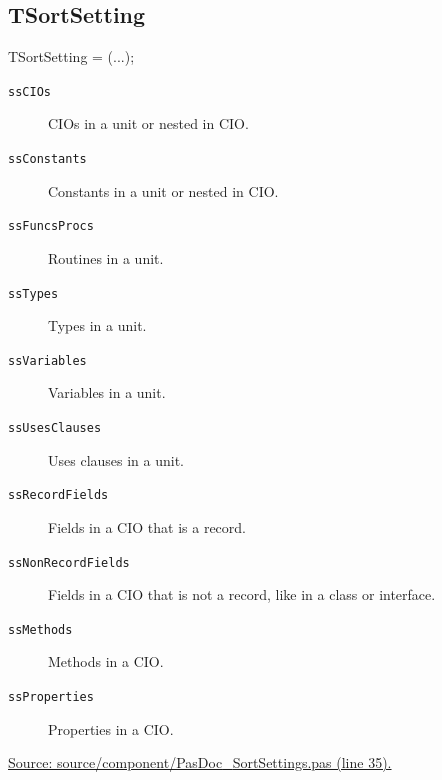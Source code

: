 \documentclass{report}
\newif\ifpdf
\begin{document}
\subsection*{TSortSetting}
\fi
\label{PasDoc_SortSettings-TSortSetting}
\begin{list}{}{
\setlength{\itemindent}{0cm}
\setlength{\listparindent}{0cm}
\setlength{\leftmargin}{\evensidemargin}
\addtolength{\leftmargin}{\tmplength}
\settowidth{\labelsep}{X}
\addtolength{\leftmargin}{\labelsep}
\setlength{\labelwidth}{\tmplength}
}
\item[\textbf{Declaration}\hfill]
\ifpdf
\begin{flushleft}
\fi
\begin{ttfamily}
TSortSetting = (...);\end{ttfamily}

\ifpdf
\end{flushleft}
\fi

\par
\item[\textbf{Description}]
 \item[\textbf{Values}]
\begin{description}
\item[\texttt{ssCIOs}] \label{PasDoc_SortSettings-ssCIOs}
\index{}
CIOs in a unit or nested in CIO.
\item[\texttt{ssConstants}] \label{PasDoc_SortSettings-ssConstants}
\index{}
Constants in a unit or nested in CIO.
\item[\texttt{ssFuncsProcs}] \label{PasDoc_SortSettings-ssFuncsProcs}
\index{}
Routines in a unit.
\item[\texttt{ssTypes}] \label{PasDoc_SortSettings-ssTypes}
\index{}
Types in a unit.
\item[\texttt{ssVariables}] \label{PasDoc_SortSettings-ssVariables}
\index{}
Variables in a unit.
\item[\texttt{ssUsesClauses}] \label{PasDoc_SortSettings-ssUsesClauses}
\index{}
Uses clauses in a unit.
\item[\texttt{ssRecordFields}] \label{PasDoc_SortSettings-ssRecordFields}
\index{}
Fields in a CIO that is a record.
\item[\texttt{ssNonRecordFields}] \label{PasDoc_SortSettings-ssNonRecordFields}
\index{}
Fields in a CIO that is not a record, like in a class or interface.
\item[\texttt{ssMethods}] \label{PasDoc_SortSettings-ssMethods}
\index{}
Methods in a CIO.
\item[\texttt{ssProperties}] \label{PasDoc_SortSettings-ssProperties}
\index{}
Properties in a CIO.
\end{description}
\par
\href{https://github.com/pasdoc/pasdoc/blob/master/source/component/PasDoc_SortSettings.pas#L35}{Source: source/component/PasDoc{\_}SortSettings.pas (line 35).}

\end{list}
\ifpdf
\end{document}
